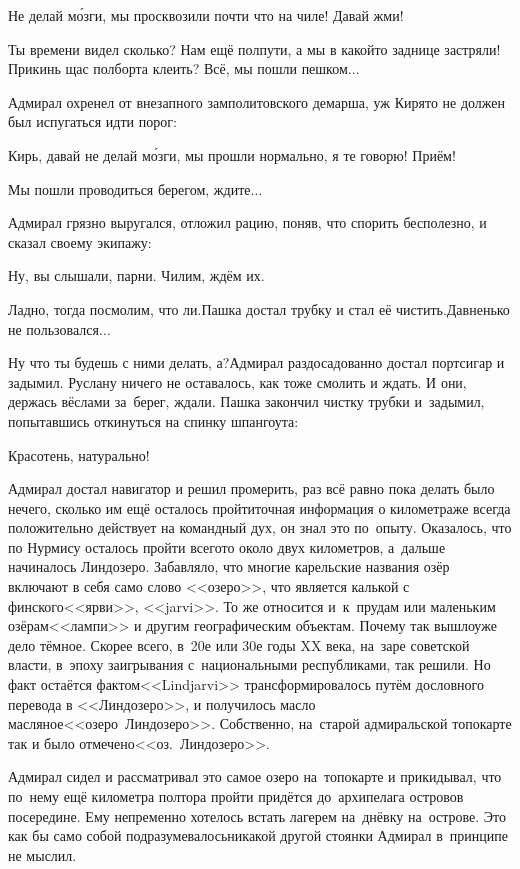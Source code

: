 \diagdash Не делай м\'{о}зги, мы просквозили почти что на чиле! Давай жми!

\diagdash Ты времени видел сколько? Нам ещё полпути, а мы в какой\sdash то заднице застряли! Прикинь щас полборта клеить? Всё, мы пошли пешком$\ldots$

Адмирал охренел от внезапного замполитовского демарша, уж Киря\sdash то не должен был испугаться идти порог:

\diagdash Кирь, давай не делай м\'{о}зги, мы прошли нормально, я те говорю! Приём!

\diagdash Мы пошли проводиться берегом, ждите$\ldots$

Адмирал грязно выругался, отложил рацию, поняв, что спорить бесполезно, и сказал своему экипажу:

\diagdash Ну, вы слышали, парни. Чилим, ждём их.

\diagdash Ладно, тогда посмолим, что ли.\mdash Пашка достал трубку и стал её чистить.\mdash Давненько не пользовался$\ldots$

\diagdash Ну что ты будешь с ними делать, а?\mdash Адмирал раздосадованно достал портсигар и задымил. Руслану ничего не оставалось, как тоже смолить и ждать. И они, держась вёслами за~берег, ждали. Пашка закончил чистку трубки и~задымил, попытавшись откинуться на спинку шпангоута:

\diagdash Красотень, натурально!

Адмирал достал навигатор и решил промерить, раз всё равно пока делать было нечего, сколько им ещё осталось пройти\mdash точная информация о километраже всегда положительно действует на командный дух, он знал это по~опыту. Оказалось, что по Нурмису осталось пройти всего\sdash то около двух километров, а~дальше начиналось Линдозеро. Забавляло, что многие карельские названия озёр включают в себя само слово <<озеро>>, что является калькой с финского\mdash <<ярви>>, <<jarvi>>. То же относится и~к~прудам или маленьким озёрам\mdash <<лампи>> и другим географическим объектам. Почему так вышло\mdash уже дело тёмное. Скорее всего, в~20\sdash е или 30\sdash е годы XX века, на~заре советской власти, в~эпоху заигрывания с~национальными республиками, так решили. Но факт остаётся фактом\mdash <<Lindjarvi>> трансформировалось путём дословного перевода в <<Линдозеро>>, и получилось масло масляное\mdash <<озеро~Линдозеро>>. Собственно, на~старой адмиральской топокарте так и было отмечено\mdash <<оз.~Линдозеро>>. 

Адмирал сидел и рассматривал это самое озеро на~топокарте и прикидывал, что по~нему ещё километра полтора пройти придётся до~архипелага островов посередине. Ему непременно хотелось встать лагерем на~днёвку на~острове. Это как бы само собой подразумевалось\mdash никакой другой стоянки Адмирал в~принципе не мыслил.

